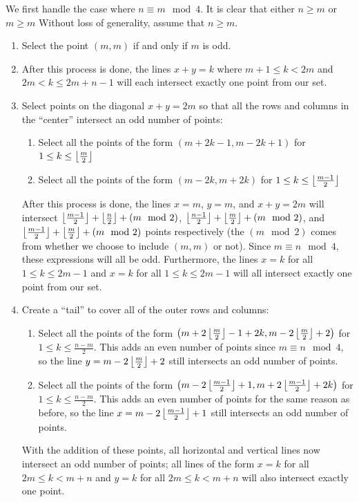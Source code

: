 \documentclass[10pt]{../usamts}
\begin{document}
\begin{solution}
\clearpage
We first handle the case where $n \equiv m \mod 4$. It is clear that either $n \geq m$ or $m \geq m$ Without loss of generality, assume that $n \geq m$.
\begin{enumerate}
    \item Select the point $(m,m)$ if and only if $m$ is odd.
    \item \mainaxis
    After this process is done, the lines $x+y = k$ where $m+1 \leq k < 2m$ and $2m < k \leq 2m+n-1$ will each intersect exactly one point from our set.
    \item Select points on the diagonal $x+y = 2m$ so that all the rows and columns in the ``center'' intersect an odd number of points:
    \begin{enumerate}
        \item Select all the points of the form $(m+2k-1,m-2k+1)$ for $1 \leq k \leq \left\lfloor \frac{m}{2} \right\rfloor$
        \item Select all the points of the form $(m-2k,m+2k)$ for $1 \leq k \leq \left\lfloor \frac{m-1}{2} \right\rfloor$
    \end{enumerate}
    After this process is done, the lines $x=m$, $y=m$, and $x+y = 2m$ will intersect $\left\lfloor \frac{m-1}{2} \right\rfloor + \left\lfloor \frac{n}{2} \right\rfloor + (m \mod 2)$, $\left\lfloor \frac{n-1}{2} \right\rfloor + \left\lfloor \frac{m}{2} \right\rfloor + (m \mod 2)$, and $\left\lfloor \frac{m-1}{2} \right\rfloor + \left\lfloor \frac{m}{2} \right\rfloor + (m \mod 2)$ points respectively (the $(m \mod 2)$ comes from whether we choose to include $(m,m)$ or not). Since $m \equiv n \mod 4$, these expressions will all be odd. Furthermore, the lines $x=k$ for all $1 \leq k \leq 2m-1$ and $x=k$ for all $1 \leq k \leq 2m-1$ will all intersect exactly one point from our set.
    \item Create a ``tail'' to cover all of the outer rows and columns:
    \begin{enumerate}
        \item Select all the points of the form $\left(  m+2\left\lfloor \frac{m}{2} \right\rfloor-1+2k, m-2\left\lfloor \frac{m}{2} \right\rfloor+2  \right)$ for $1 \leq k \leq \frac{n-m}{2}$. This adds an even number of points since $m \equiv n \mod 4$, so the line $y = m-2\left\lfloor \frac{m}{2} \right\rfloor+2$ still intersects an odd number of points.
        \item Select all the points of the form $\left(  m-2\left\lfloor \frac{m-1}{2} \right\rfloor+1, m+2\left\lfloor \frac{m-1}{2} \right\rfloor+2k  \right)$ for $1 \leq k \leq \frac{n-m}{2}$. This adds an even number of points for the same reason as before, so the line $x = m-2\left\lfloor \frac{m-1}{2} \right\rfloor+1$ still intersects an odd number of points.
    \end{enumerate}
    With the addition of these points, all horizontal and vertical lines now intersect an odd number of points; all lines of the form $x = k$ for all $2m \leq k < m+n$ and $y=k$ for all $2m \leq k < m+n$ will also intersect exactly one point.
    

\end{enumerate}
\end{solution}
\end{document}
